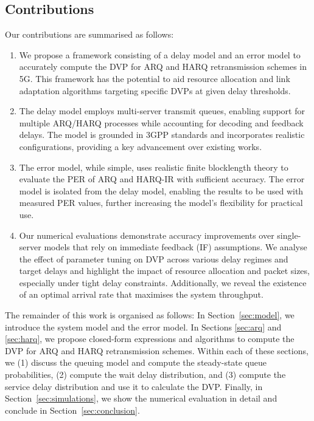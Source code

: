 \subsection{Contributions}
Our contributions are summarised as follows:
\begin{enumerate} 
\item We propose a framework consisting of a delay model and an error model to accurately compute the DVP for ARQ and HARQ retransmission schemes in 5G. This framework has the potential to aid resource allocation and link adaptation algorithms targeting specific DVPs at given delay thresholds.
\item The delay model employs multi-server transmit queues, enabling support for multiple ARQ/HARQ processes while accounting for decoding and feedback delays. The model is grounded in 3GPP standards and incorporates realistic configurations, providing a key advancement over existing works.
\item The error model, while simple, uses realistic finite blocklength theory to evaluate the PER of ARQ and HARQ-IR with sufficient accuracy. The error model is isolated from the delay model, enabling the results to be used with measured PER values, further increasing the model's flexibility for practical use.
\item Our numerical evaluations demonstrate accuracy improvements over single-server models that rely on immediate feedback (IF) assumptions.
We analyse the effect of parameter tuning on DVP across various delay regimes and target delays and highlight the impact of resource allocation and packet sizes, especially under tight delay constraints. 
Additionally, we reveal the existence of an optimal arrival rate that maximises the system throughput. 
\end{enumerate}


The remainder of this work is organised as follows: In Section~\ref{sec:model}, we introduce the system model and the error model. 
In Sections \ref{sec:arq} and \ref{sec:harq}, we propose closed-form expressions and algorithms to compute the DVP for ARQ and HARQ retransmission schemes. Within each of these sections, we (1) discuss the queuing model and compute the steady-state queue probabilities, (2) compute the wait delay distribution, and (3) compute the service delay distribution and use it to calculate the DVP. 
Finally, in Section~\ref{sec:simulations}, we show the numerical evaluation in detail and conclude in Section~\ref{sec:conclusion}.
